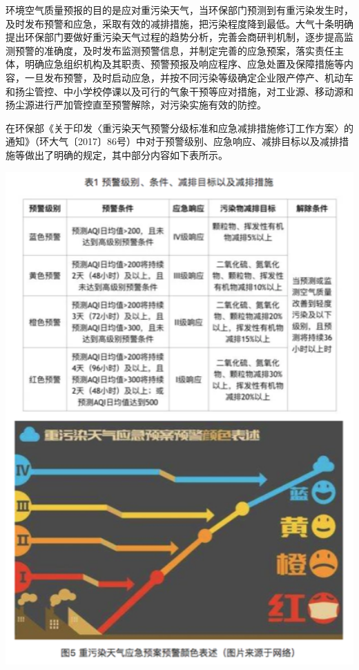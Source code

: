 \documentclass[]{book}
\begin{document}
环境空气质量预报的目的是应对重污染天气，当环保部门预测到有重污染发生时，及时发布预警和应急，采取有效的减排措施，把污染程度降到最低。大气十条明确提出环保部门要做好重污染天气过程的趋势分析，完善会商研判机制，逐步提高监测预警的准确度，及时发布监测预警信息，并制定完善的应急预案，落实责任主体，明确应急组织机构及其职责、预警预报及响应程序、应急处置及保障措施等内容，一旦发布预警，及时启动应急，并按不同污染等级确定企业限产停产、机动车和扬尘管控、中小学校停课以及可行的气象干预等应对措施，对工业源、移动源和扬尘源进行严加管控直至预警解除，对污染实施有效的防控。

在环保部《关于印发〈重污染天气预警分级标准和应急减排措施修订工作方案〉的通知》（环大气〔2017〕86号）中对于预警级别、应急响应、减排目标以及减排措施等做出了明确的规定，其中部分内容如下表所示。

\includegraphics[width=5.89in]{images/kqyb5}
\end{document}
